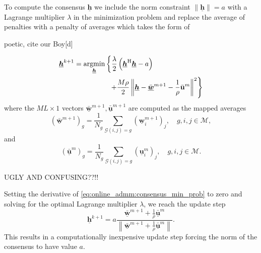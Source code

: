 \documentclass{article}
\newcommand{\uu}{\mtxb{u}}
\newcommand{\hf}{\underline{\bm{h}}}
\newcommand{\wf}{\underline{\bm{w}}}
\newcommand{\uuf}{\underline{\bm{u}}}
\newcommand{\Mset}{\mathcal{M}}
\begin{document}
To compute the consensus \(\hf\) we include the norm constraint \(\|\hf\| = a\) with a Lagrange multiplier \(\lambda\) in the minimization problem and replace the average of penalties with a penalty of averages which takes the form of
\begin{attention}
    poetic, cite our Boy[d]
\end{attention}
\begin{align}
    \hf^{k+1} &= \underset{\hf}{\operatorname{argmin}} \left\{ \frac{\lambda}{2} \left(\hf^\herm \hf - a\right)\right.\nonumber\\
    &\left. \qquad \qquad \quad + \frac{M \rho}{2} \left\| \hf - \bar{\wf}^{m+1} - \frac{1}{\rho} \bar{\uu}^{m} \right\|^2 \right\}\label{eq:online_admm:consensus_min_prob}
\end{align}
where the \(M L \times 1\) vectors \(\bar{\wf}^{m+1}, \bar{\uuf}^{m+1}\) are computed as the mapped averages
\begin{equation}
    (\bar{\wf}^{m+1})_g = \frac{1}{N_g} \sum_{\mathcal{G}(i,j)=g} (\wf_i^{m+1})_j,\quad g,i,j \in \Mset,
\end{equation}
and
\begin{equation}
    (\bar{\uuf}^{m})_g = \frac{1}{N_g} \sum_{\mathcal{G}(i,j)=g} (\uuf_i^{m})_j,\quad g,i,j \in \Mset.
\end{equation}
\begin{attention}
    UGLY AND CONFUSING??!!
\end{attention}
Setting the derivative of \eqref{eq:online_admm:consensus_min_prob} to zero and solving for the optimal Lagrange multiplier \(\lambda\), we reach the update step
\begin{equation}
    \hf^{k+1} = a\frac{\bar{\wf}^{m+1} + \frac{1}{\rho} \bar{\uuf}^{m} }{\left\| \bar{\wf}^{m+1} + \frac{1}{\rho} \bar{\uuf}^{m} \right\|}.\label{eq:online_admm:consensus_update}
\end{equation}
This results in a computationally inexpensive update step forcing the norm of the consensus to have value \(a\).

\end{document}

